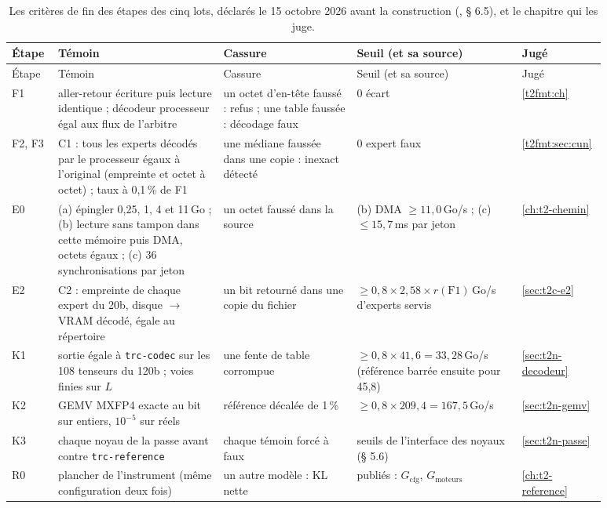 \begingroup\small
\renewcommand{\arraystretch}{1.12}
\begin{longtable}{@{}p{0.07\linewidth}p{0.26\linewidth}p{0.21\linewidth}p{0.26\linewidth}p{0.08\linewidth}@{}}
\caption[Les critères de fin des étapes]{Les critères de fin des étapes des cinq lots, déclarés le 15 octobre 2026 avant la construction (, § 6.5), et le chapitre qui les juge.}\label{t2ann:tab:etapes}\\
\toprule
Étape & Témoin & Cassure & Seuil (et sa source) & Jugé \\
\midrule
\endfirsthead
\toprule
Étape & Témoin & Cassure & Seuil (et sa source) & Jugé \\
\midrule
\endhead
F1 & aller-retour écriture puis lecture identique ; décodeur processeur égal aux flux de l'arbitre & un octet d'en-tête faussé : refus ; une table faussée : décodage faux & 0 écart & \cref{t2fmt:ch} \\
F2, F3 & C1 : tous les experts décodés par le processeur égaux à l'original (empreinte et octet à octet) ; taux à 0,1\,\% de F1 & une médiane faussée dans une copie : inexact détecté & 0 expert faux & \cref{t2fmt:sec:cun} \\
E0 & (a) épingler 0,25, 1, 4 et 11\,Go ; (b) lecture sans tampon dans cette mémoire puis DMA, octets égaux ; (c) 36 synchronisations par jeton & un octet faussé dans la source & (b) DMA $\ge 11{,}0$\,Go/s ; (c) $\le 15{,}7$\,ms par jeton & \cref{ch:t2-chemin} \\
E2 & C2 : empreinte de chaque expert du 20b, disque $\to$ VRAM décodé, égale au répertoire & un bit retourné dans une copie du fichier & $\ge 0{,}8 \times 2{,}58 \times r(\mathrm{F1})$\,Go/s d'experts servis & \cref{sec:t2c-e2} \\
K1 & sortie égale à \texttt{trc-codec} sur les 108 tenseurs du 120b ; voies finies sur $L$ & une fente de table corrompue & $\ge 0{,}8 \times 41{,}6 = 33{,}28$\,Go/s (référence barrée ensuite pour 45,8) & \cref{sec:t2n-decodeur} \\
K2 & GEMV MXFP4 exacte au bit sur entiers, $10^{-5}$ sur réels & référence décalée de 1\,\% & $\ge 0{,}8 \times 209{,}4 = 167{,}5$\,Go/s & \cref{sec:t2n-gemv} \\
K3 & chaque noyau de la passe avant contre \texttt{trc-reference} & chaque témoin forcé à faux & seuils de l'interface des noyaux (§ 5.6) & \cref{sec:t2n-passe} \\
R0 & plancher de l'instrument (même configuration deux fois) & un autre modèle : KL nette & publiés : $G_{\text{cfg}}$, $G_{\text{moteurs}}$ & \cref{ch:t2-reference} \\

\end{longtable}

